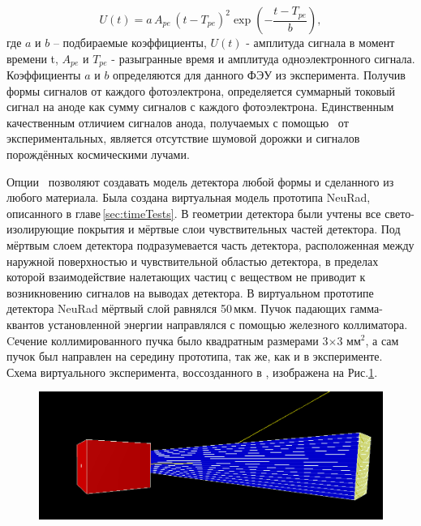 \begin{enumerate}
	\begin{equation}
	\label{eq:1electronSIM}
	U(t)=a\, A_{pe}\,(t-T_{pe})^2 \exp\left(- \frac{t-T_{pe}}{b} \right),
	\end{equation}
	где $a$ и $b$ – подбираемые коэффициенты, $U(t)$ - амплитуда сигнала в момент времени t, $A_{pe}$ и $T_{pe}$ - разыгранные время и амплитуда одноэлектронного сигнала. 
	Коэффициенты $a$ и $b$ определяются для данного ФЭУ из эксперимента.
	Получив формы сигналов от каждого фотоэлектрона, определяется суммарный токовый сигнал на аноде как сумму сигналов с каждого фотоэлектрона. 
	Единственным качественным отличием сигналов анода, получаемых с помощью \er\ от экспериментальных, является отсутствие шумовой дорожки и сигналов порождённых космическими лучами.
	
\end{enumerate}

Опции \er\ позволяют создавать модель детектора любой формы и сделанного из любого материала. Была создана виртуальная модель прототипа NeuRad, описанного в главе\,\ref{sec:timeTests}. В геометрии детектора были учтены все свето-изолирующие покрытия и мёртвые слои чувствительных частей детектора. 
Под мёртвым слоем детектора подразумевается  часть детектора, расположенная между наружной поверхностью и чувствительной областью детектора, в пределах которой взаимодействие налетающих частиц с веществом не приводит к возникновению сигналов на выводах детектора.
В виртуальном прототипе детектора NeuRad мёртвый слой равнялся 50\,мкм. Пучок падающих гамма-квантов установленной энергии направлялся с помощью железного коллиматора. Cечение коллимированного пучка было квадратным размерами 3$\times$3 мм$^ 2$, а сам пучок был направлен на середину прототипа, так же, как и в эксперименте.
Схема виртуального эксперимента, воссозданного в \er, изображена на Рис.\ref{ris:sim}. 

\begin{figure}
	\centering
	\includegraphics[width=\linewidth]{sim.png}
	\label{ris:sim}
\end{figure}

